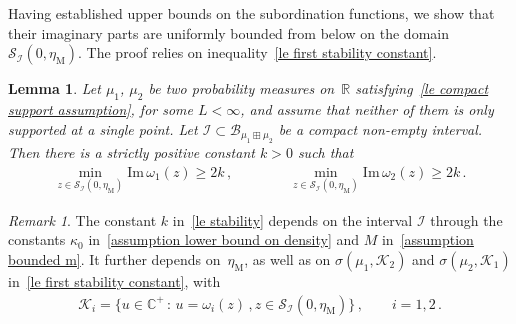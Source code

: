 \documentclass[10pt,reqno]{amsart}
\numberwithin{equation}{section}
\theoremstyle{plain}
\newtheorem{lemma}[theorem]{Lemma}
\newcounter{kevin}
\numberwithin{kevin}{section}
\theoremstyle{remark}
\newtheorem{remark}[kevin]{Remark}
\newcommand{\im}{\mathrm{Im}\,}
\newcommand{\R}{{\mathbb R }}
\newcommand{\C}{{\mathbb C}}
\begin{document}
Having established upper bounds on the subordination functions, we show that their imaginary parts are uniformly bounded from below on the domain $\mathcal{S}_{\mathcal{I}}(0,\eta_{\mathrm{M}})$. The proof relies on inequality~\eqref{le first stability constant}.

\begin{lemma}\label{le lemma stability}
Let $\mu_1$, $\mu_2$ be two probability measures on~$\R$ satisfying~\eqref{le compact support assumption}, for some $L<\infty$, and assume that neither of them is only supported at a single point. Let $\mathcal{I}\subset \mathcal{B}_{\mu_1\boxplus\mu_2}$ be a compact non-empty interval. Then there is a strictly positive constant $k>0$ such that
\begin{align}\label{le stability}
  \min_{z\in \mathcal{S}_{\mathcal{I}}(0,\eta_{\mathrm{M}})}\im \omega_1(z)\ge 2k\,,\qquad\qquad \min_{z\in \mathcal{S}_{\mathcal{I}}(0,\eta_{\mathrm{M}})}\im \omega_2(z)\ge 2k\,.
\end{align}
\end{lemma}
\begin{remark}\label{le remark for k}
 The constant $k$ in~\eqref{le stability} depends on the interval $\mathcal{I}$ through the constants $\kappa_0$ in~\eqref{assumption lower bound on density} and $M$ in~\eqref{assumption bounded m}. It further depends on~$\eta_{\mathrm{M}}$, as well as on $\sigma(\mu_1,\mathcal{K}_2)$ and $\sigma(\mu_2,\mathcal{K}_1)$ in~\eqref{le first stability constant}, with 
 \begin{align}\label{le kevin set}
 \mathcal{K}_i=\{u\in\C^+\,:\, u=\omega_{i}(z)\,, z\in\mathcal{S}_{\mathcal{I}}(0,\eta_{\mathrm{M}})\}\,,\qquad i=1,2\,.
 \end{align}
\end{remark}
\end{document}
